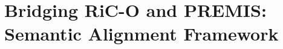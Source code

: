 \documentclass[runningheads]{llncs}
\begin{document}
	
	\section{Bridging RiC-O and PREMIS: Semantic Alignment Framework}
	\label{sec:alignment-framework}
	
	
\end{document}
